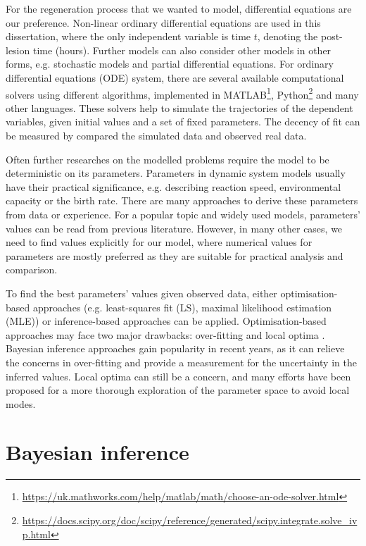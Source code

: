 For the regeneration process that we wanted to model, differential equations are our preference. Non-linear ordinary differential equations are used in this dissertation, where the only independent variable is time $t$, denoting the post-lesion time (hours). Further models can also consider other models in other forms, e.g. stochastic models and partial differential equations. For ordinary differential equations (ODE) system, there are several available computational solvers using different algorithms, implemented in MATLAB\footnote[1] {\url{https://uk.mathworks.com/help/matlab/math/choose-an-ode-solver.html}}, Python\footnote[2]{\url{https://docs.scipy.org/doc/scipy/reference/generated/scipy.integrate.solve_ivp.html}} and many other languages. These solvers help to simulate the trajectories of the dependent variables, given initial values and a set of fixed parameters. The decency of fit can be measured by compared the simulated data and observed real data.

Often further researches on the modelled problems require the model to be deterministic on its parameters. Parameters in dynamic system models usually have their practical significance, e.g. describing reaction speed, environmental capacity or the birth rate. There are many approaches to derive these parameters from data or experience. For a popular topic and widely used models, parameters' values can be read from previous literature. However, in many other cases, we need to find values explicitly for our model, where numerical values for parameters are mostly preferred as they are suitable for practical analysis and comparison.

To find the best parameters' values given observed data, either optimisation-based approaches (e.g. least-squares fit (LS), maximal likelihood estimation (MLE)) or inference-based approaches can be applied. Optimisation-based approaches may face two major drawbacks: over-fitting and local optima \cite{ref:abcsysbio}. Bayesian inference approaches gain popularity in recent years, as it can relieve the concerns in over-fitting and provide a measurement for the uncertainty in the inferred values. Local optima can still be a concern, and many efforts have been proposed for a more thorough exploration of the parameter space to avoid local modes.



\section{Bayesian inference}

